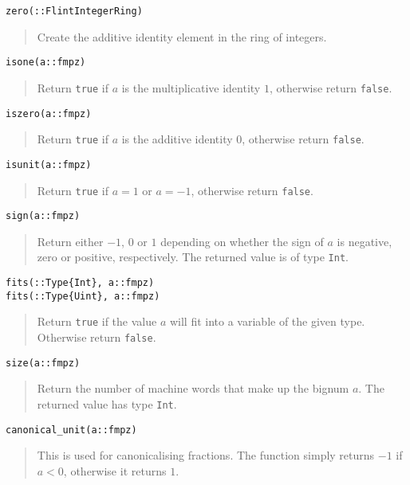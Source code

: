 \documentclass[a4paper,10pt]{article}
\newcommand{\code}{\lstinline}
\newcommand{\desc}[1]{\vspace{-3mm}\begin{quote}#1\end{quote}}
\begin{document}
\begin{lstlisting}
zero(::FlintIntegerRing)
\end{lstlisting}

\desc{Create the additive identity element in the ring of integers.}

\begin{lstlisting}
isone(a::fmpz)
\end{lstlisting}

\desc{Return \code{true} if $a$ is the multiplicative identity $1$, otherwise
return \code{false}.}

\begin{lstlisting}
iszero(a::fmpz)
\end{lstlisting}

\desc{Return \code{true} if $a$ is the additive identity $0$, otherwise
return \code{false}.}

\begin{lstlisting}
isunit(a::fmpz)
\end{lstlisting}

\desc{Return \code{true} if $a = 1$ or $a = -1$, otherwise return \code{false}.}

\begin{lstlisting}
sign(a::fmpz)
\end{lstlisting}

\desc{Return either $-1$, $0$ or $1$ depending on whether the sign of $a$ is negative,
zero or positive, respectively. The returned value is of type \code{Int}.}

\begin{lstlisting}
fits(::Type{Int}, a::fmpz)
fits(::Type{Uint}, a::fmpz)
\end{lstlisting}

\desc{Return \code{true} if the value $a$ will fit into a variable of the given
type. Otherwise return \code{false}.}

\begin{lstlisting}
size(a::fmpz)
\end{lstlisting}

\desc{Return the number of machine words that make up the bignum $a$. The
returned value has type \code{Int}.}

\begin{lstlisting}
canonical_unit(a::fmpz)
\end{lstlisting}

\desc{This is used for canonicalising fractions. The function simply returns $-1$
if $a < 0$, otherwise it returns $1$.}
\end{document}
